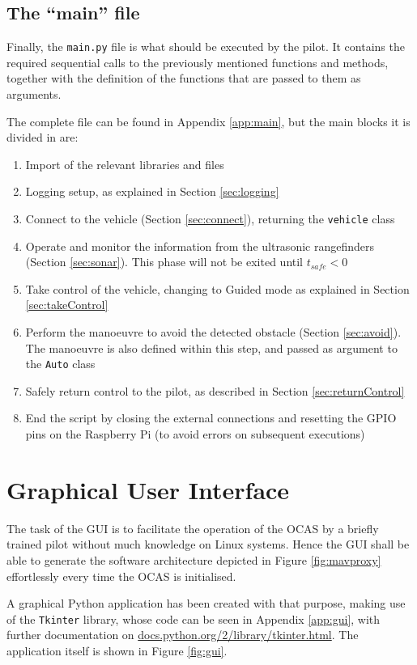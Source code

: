 \subsection{The ``main'' file}

Finally, the \texttt{main.py} file is what should be executed by the pilot.
It contains the required sequential calls to the previously mentioned functions and methods, together with the definition of the functions that are passed to them as arguments.

The complete file can be found in Appendix \ref{app:main}, but the main blocks it is divided in are:

\begin{enumerate}
	\item Import of the relevant libraries and files
	\item Logging setup, as explained in Section \ref{sec:logging}
	\item Connect to the vehicle (Section \ref{sec:connect}), returning the \texttt{vehicle} class
	\item Operate and monitor the information from the ultrasonic rangefinders (Section \ref{sec:sonar}). This phase will not be exited until $t_{safe}<0$
	\item Take control of the vehicle, changing to Guided mode as explained in Section \ref{sec:takeControl}
	\item Perform the manoeuvre to avoid the detected obstacle (Section \ref{sec:avoid}). The manoeuvre is also defined within this step, and passed as argument to the \texttt{Auto} class
	\item Safely return control to the pilot, as described in Section \ref{sec:returnControl}
	\item End the script by closing the external connections and resetting the GPIO pins on the Raspberry Pi (to avoid errors on subsequent executions)
\end{enumerate}


\section{Graphical User Interface}

The task of the GUI is to facilitate the operation of the OCAS by a briefly trained pilot without much knowledge on Linux systems.
Hence the GUI shall be able to generate the software architecture depicted in Figure \ref{fig:mavproxy} effortlessly every time the OCAS is initialised.

A graphical Python application has been created with that purpose, making use of the \texttt{Tkinter} library, whose code can be seen in Appendix \ref{app:gui}, with further documentation on \url{docs.python.org/2/library/tkinter.html}.
The application itself is shown in Figure \ref{fig:gui}.

